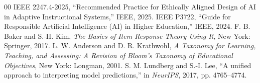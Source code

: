 \documentclass[conference]{IEEEtran}
\begin{document}
\begin{thebibliography}{00}
 IEEE 2247.4-2025, ``Recommended Practice for Ethically Aligned Design of AI in Adaptive Instructional Systems,'' IEEE, 2025.
 IEEE P3722, ``Guide for Responsible Artificial Intelligence (AI) in Higher Education,'' IEEE, 2024.
 F. B. Baker and S.-H. Kim, \textit{The Basics of Item Response Theory Using R}, New York: Springer, 2017.
 L. W. Anderson and D. R. Krathwohl, \textit{A Taxonomy for Learning, Teaching, and Assessing: A Revision of Bloom's Taxonomy of Educational Objectives}, New York: Longman, 2001.
 S. M. Lundberg and S.-I. Lee, ``A unified approach to interpreting model predictions,'' in \textit{NeurIPS}, 2017, pp. 4765--4774.
\end{thebibliography}
\end{document}
